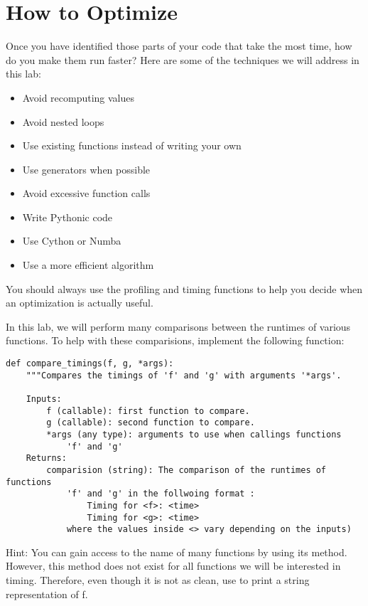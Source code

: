 \section*{How to Optimize}
Once you have identified those parts of your code that take the most time,
how do you make them run faster?
Here are some of the techniques we will address in this lab:

\begin{itemize}
\item Avoid recomputing values
\item Avoid nested loops
\item Use existing functions instead of writing your own
\item Use generators when possible
\item Avoid excessive function calls
\item Write Pythonic code
\item Use Cython or Numba
\item Use a more efficient algorithm
\end{itemize}

You should always use the profiling and timing functions to help you decide
when an optimization is actually useful.

\begin{problem}
In this lab, we will perform many comparisons between the runtimes of various
functions. To help with these comparisions, implement the following function:

\begin{lstlisting}
def compare_timings(f, g, *args):
    """Compares the timings of 'f' and 'g' with arguments '*args'.

    Inputs:
        f (callable): first function to compare.
        g (callable): second function to compare.
        *args (any type): arguments to use when callings functions
            'f' and 'g'
    Returns:
        comparision (string): The comparison of the runtimes of functions
            'f' and 'g' in the follwoing format :
                Timing for <f>: <time>
                Timing for <g>: <time>
            where the values inside <> vary depending on the inputs)
\end{lstlisting}
Hint: You can gain access to the name of many functions by using its
 method. However, this method does not exist for all functions
we will be interested in timing. Therefore, even though it is not as clean, use
 to print a string representation of f.
\end{problem}

